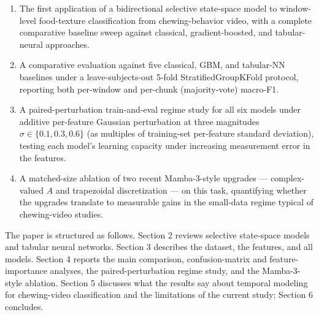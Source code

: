 \documentclass{article}
\begin{document}
\begin{enumerate}
    \item The first application of a bidirectional selective state-space model to window-level food-texture classification from chewing-behavior video, with a complete comparative baseline sweep against classical, gradient-boosted, and tabular-neural approaches.
    \item A comparative evaluation against five classical, GBM, and tabular-NN baselines under a leave-subjects-out 5-fold StratifiedGroupKFold protocol, reporting both per-window and per-chunk (majority-vote) macro-F1.
    \item A paired-perturbation train-and-eval regime study for all six models under additive per-feature Gaussian perturbation at three magnitudes $\sigma \in \{0.1, 0.3, 0.6\}$ (as multiples of training-set per-feature standard deviation), testing each model's learning capacity under increasing measurement error in the features.
    \item A matched-size ablation of two recent Mamba-3-style upgrades --- complex-valued $A$ and trapezoidal discretization --- on this task, quantifying whether the upgrades translate to measurable gains in the small-data regime typical of chewing-video studies.
\end{enumerate}

The paper is structured as follows. Section 2 reviews selective state-space models and tabular neural networks. Section 3 describes the dataset, the features, and all models. Section 4 reports the main comparison, confusion-matrix and feature-importance analyses, the paired-perturbation regime study, and the Mamba-3-style ablation. Section 5 discusses what the results say about temporal modeling for chewing-video classification and the limitations of the current study; Section 6 concludes.
\end{document}
